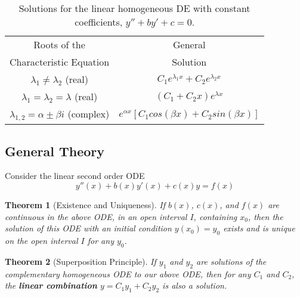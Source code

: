 \documentclass[12pt]{article}
\newtheorem{thm}{Theorem}[section]
\theoremstyle{definition}
\theoremstyle{remark}
\numberwithin{equation}{section}
\newcommand\B[1]{\textbf{ #1}}
\begin{document}
\bgroup
\def\arraystretch{1.5}
\begin{table}[H]
        \centering
        \caption{Solutions for the linear homogeneous DE with constant coefficients, $y'' + by' + c = 0$.}
        \begin{tabular}{c|c}
                Roots of the & General \\ 
                Characteristic Equation & Solution \\ \hline
                $\lambda_1 \neq \lambda_2$ (real) & $C_1e^{\lambda_1 x}+C_2e^{\lambda_2 x}$ \\
                $\lambda_1 = \lambda_2 = \lambda$ (real) & $(C_1+C_2x)e^{\lambda x}$ \\
                $\lambda_{1,2} = \alpha \pm \beta i$ (complex) & $e^{\alpha x}[C_1cos(\beta x) + C_2sin(\beta x)]$ \\
        \end{tabular}
\end{table}
\egroup



\vspace{1cm}


\subsection{General Theory}

Consider the linear second order ODE \begin{equation}
        y''(x)+b(x)y'(x)+c(x)y=f(x)
\end{equation}


\begin{thm}[Existence and Uniqueness]
         If $b(x)$, $c(x)$, and $f(x)$ are continuous in the above ODE, in an open interval $I$, containing $x_0$, then the solution of this ODE with an initial condition $y(x_0) = y_0$ exists and is unique on the open interval $I$ for any $y_0$.
\end{thm}

\vspace{1cm}


\begin{thm}[Superposition Principle]
        If $y_1$ and $y_2$ are solutions of the complementary homogeneous ODE to our above ODE, then for any $C_1$ and $C_2$, the \B{linear combination} $y = C_1y_1+C_2y_2$ is also a solution.
\end{thm}


\vspace{1cm}
\end{document}
